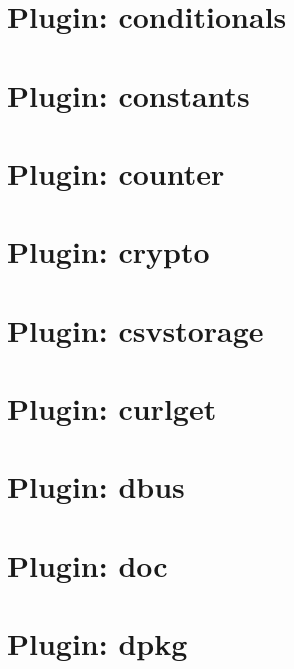 \documentclass[twoside]{book}
\newcommand{\+}{\discretionary{\mbox{\scriptsize$\hookleftarrow$}}{}{}}
\begin{document}
\chapter{Plugin\+: conditionals}
\label{md_src_plugins_conditionals_README}
\hypertarget{md_src_plugins_conditionals_README}{}

\chapter{Plugin\+: constants}
\label{md_src_plugins_constants_README}
\hypertarget{md_src_plugins_constants_README}{}

\chapter{Plugin\+: counter}
\label{md_src_plugins_counter_README}
\hypertarget{md_src_plugins_counter_README}{}

\chapter{Plugin\+: crypto}
\label{md_src_plugins_crypto_README}
\hypertarget{md_src_plugins_crypto_README}{}

\chapter{Plugin\+: csvstorage}
\label{md_src_plugins_csvstorage_README}
\hypertarget{md_src_plugins_csvstorage_README}{}

\chapter{Plugin\+: curlget}
\label{md_src_plugins_curlget_README}
\hypertarget{md_src_plugins_curlget_README}{}

\chapter{Plugin\+: dbus}
\label{md_src_plugins_dbus_README}
\hypertarget{md_src_plugins_dbus_README}{}

\chapter{Plugin\+: doc}
\label{md_src_plugins_doc_README}
\hypertarget{md_src_plugins_doc_README}{}

\chapter{Plugin\+: dpkg}
\label{md_src_plugins_dpkg_README}
\hypertarget{md_src_plugins_dpkg_README}{}

\end{document}
